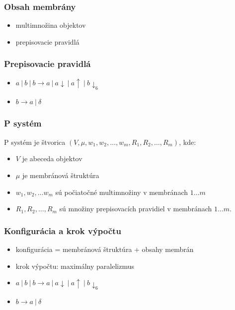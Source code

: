 \documentclass{beamer}
\begin{document}
\begin{frame}[t]\frametitle{Obsah membrány}
\begin{itemize}
  \item multimnožina objektov
  \item prepisovacie pravidlá
\end{itemize}
\end{frame}

\begin{frame}[t]\frametitle{Prepisovacie pravidlá}
\begin{itemize}
  \item $a\ |\ b\ |\ b\rightarrow a\ |\ a\downarrow\ |\ a\uparrow\ |\ b\downarrow_6$
  \item $b \rightarrow a\ |\ \delta$
\end{itemize}
\end{frame}

\begin{frame}[t]\frametitle{P systém}

P systém je štvorica $(V, \mu, w_1, w_2,\dots , w_m, R_1, R_2, \dots , R_m)$, kde:
\begin{itemize}
  \item $V$ je abeceda objektov
  \item $\mu$ je membránová štruktúra
  \item $w_1, w_2, \dots w_m$ sú počiatočné multimnožiny v membránach $1\dots m$
  \item $R_1, R_2, \dots , R_m$ sú množiny prepisovacích pravidiel v membránach $1\dots m$.
\end{itemize}

\end{frame}

\begin{frame}[t]\frametitle{Konfigurácia a krok výpočtu}
\begin{itemize}
  \item konfigurácia = membránová štruktúra + obsahy membrán
  \item krok výpočtu: maximálny paralelizmus
\end{itemize}

\begin{itemize}
  \item $a\ |\ b\ |\ b\rightarrow a\ |\ a\downarrow\ |\ a\uparrow\ |\ b\downarrow_6$
  \item $b \rightarrow a\ |\ \delta$
\end{itemize}
\end{frame}
\end{document}
